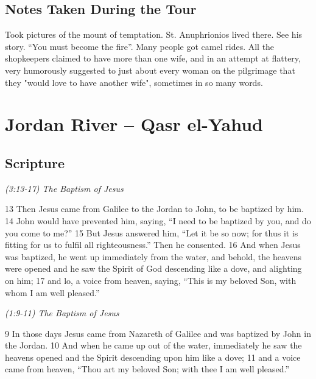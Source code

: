 \documentclass[letterpaper]{report}
\begin{document}
\subsection{Notes Taken During the Tour}
Took pictures of the mount of temptation.
St. Anuphrionios lived there. See his story. ``You must become the fire''.
Many people got camel rides.
All the shopkeepers claimed to have more than one wife,
and in an attempt at flattery, very humorously suggested to just about every woman on the pilgrimage that
they "would love to have another wife",
sometimes in so many words. 



\clearpage
\section{Jordan River -- Qasr el-Yahud}
\begin{multicols}{2}
	\mbox{}
\end{multicols}
\subsection{Scripture}

{\centering
	\emph{(3:13-17) The Baptism of Jesus}\\
}
\begin{multicols}{2}
13 Then Jesus came from Galilee to the Jordan to John, to be baptized by him. 14 John would have prevented him, saying, “I need to be baptized by you, and do you come to me?” 15 But Jesus answered him, “Let it be so now; for thus it is fitting for us to fulfil all righteousness.” Then he consented. 16 And when Jesus was baptized, he went up immediately from the water, and behold, the heavens were opened and he saw the Spirit of God descending like a dove, and alighting on him; 17 and lo, a voice from heaven, saying, “This is my beloved Son, with whom I am well pleased.”
\end{multicols}

{\centering
	\emph{(1:9-11) The Baptism of Jesus}\\
}
\begin{multicols}{2}
9 In those days Jesus came from Nazareth of Galilee and was baptized by John in the Jordan. 10 And when he came up out of the water, immediately he saw the heavens opened and the Spirit descending upon him like a dove; 11 and a voice came from heaven, “Thou art my beloved Son; with thee I am well pleased.”
\end{multicols}
\end{document}

